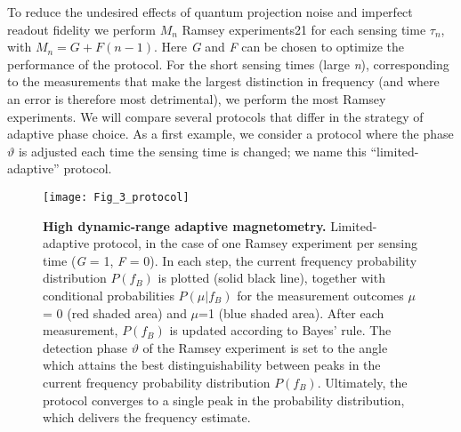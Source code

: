 To reduce the undesired effects of quantum projection noise and imperfect readout fidelity we perform $M_n$ Ramsey experiments21 for each sensing time $\tau_n$, with  $M_n = G + F (n-1)$. Here \textit{G} and \textit{F} can be chosen to optimize the performance of the protocol. For the short sensing times (large \textit{n}), corresponding to the measurements that make the largest distinction in frequency (and where an error is therefore most detrimental), we  perform the most Ramsey experiments. We will compare several protocols that differ in the strategy of adaptive phase choice. As a first example, we consider a protocol where the phase $\vartheta$ is adjusted each time the sensing time is changed; we name this “limited-adaptive” protocol. 

\begin{figure*}
	\centering
	\texttt{[image: Fig\_3\_protocol]}
	\caption{\label{fig:amm-fig3} \textbf{High dynamic-range adaptive magnetometry.} Limited-adaptive protocol, in the case of one Ramsey experiment per sensing time (\textit{G} = 1, \textit{F} = 0). In each step, the current frequency probability distribution $P(f_B)$ is plotted (solid black line), together with conditional probabilities $P(\mu|f_B)$ for the measurement outcomes $\mu$ = 0 (red shaded area) and $\mu$=1 (blue shaded area). After each measurement,  $P(f_B)$ is updated according to Bayes’ rule. The detection phase $\vartheta$ of the Ramsey experiment is set to the angle which attains the best distinguishability between peaks in the current frequency probability distribution $P(f_B)$. Ultimately, the protocol converges to a single peak in the probability distribution, which delivers the frequency estimate.}
\end{figure*}

